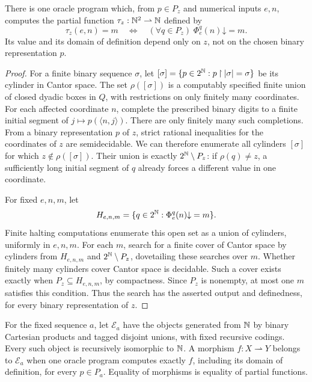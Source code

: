\begin{lemma}\label{lem:miller-unanimity}
There is one oracle program which, from $p\in P_z$ and numerical inputs
$e,n$, computes the partial function $\tau_z:\mathbb N^2\rightharpoonup\mathbb N$
defined by
\[
 \tau_z(e,n)=m
 \quad\Longleftrightarrow\quad
 (\forall q\in P_z)\;\Phi_e^q(n)\mathord\downarrow=m.
\]
Its value and its domain of definition depend only on $z$, not on the
chosen binary representation $p$.
\end{lemma}
\begin{proof}
For a finite binary sequence $\sigma$, let
$[\sigma]=\{p\in2^{\mathbb N}:p\mathbin{\upharpoonright}|\sigma|=\sigma\}$
be its cylinder in Cantor space.
The set $\rho([\sigma])$ is a computably specified finite
union of closed dyadic boxes in $Q$, with restrictions on only finitely
many coordinates. For each affected coordinate $n$, complete the
prescribed binary digits to a finite initial segment of
$j\mapsto p(\langle n,j\rangle)$. There are only finitely many such
completions.
From a binary representation $p$ of $z$, strict rational inequalities for the coordinates
of $z$ are semidecidable. We can therefore enumerate all cylinders
$[\sigma]$ for which $z\notin\rho([\sigma])$. Their union is exactly
$2^{\mathbb N}\setminus P_z$: if $\rho(q)\ne z$, a sufficiently long initial
segment of $q$ already forces a different value in one coordinate.

For fixed $e,n,m$, let
\[
 H_{e,n,m}=\{q\in2^{\mathbb N}:\Phi_e^q(n)\mathord\downarrow=m\}.
\]
Finite halting computations enumerate this open set as a union of
cylinders, uniformly in $e,n,m$. For each $m$, search for a finite cover
of Cantor space by cylinders from $H_{e,n,m}$ and
$2^{\mathbb N}\setminus P_z$, dovetailing these searches over $m$. Whether finitely
many cylinders cover Cantor space is decidable. Such a cover exists
exactly when $P_z\subseteq H_{e,n,m}$, by compactness. Since $P_z$ is
nonempty, at most one $m$ satisfies this condition. Thus the search has
the asserted output and definedness, for every binary representation of $z$.
\end{proof}

For the fixed sequence $a$, let $\mathcal E_a$ have the
objects generated from $\mathbb N$ by binary Cartesian products and tagged
disjoint unions, with fixed recursive codings. Every such object is
recursively isomorphic to $\mathbb N$. A morphism $f:X\rightharpoonup Y$ belongs
to $\mathcal E_a$ when one oracle program computes exactly $f$, including
its domain of definition, for every $p\in P_a$. Equality of morphisms is
equality of partial functions.

